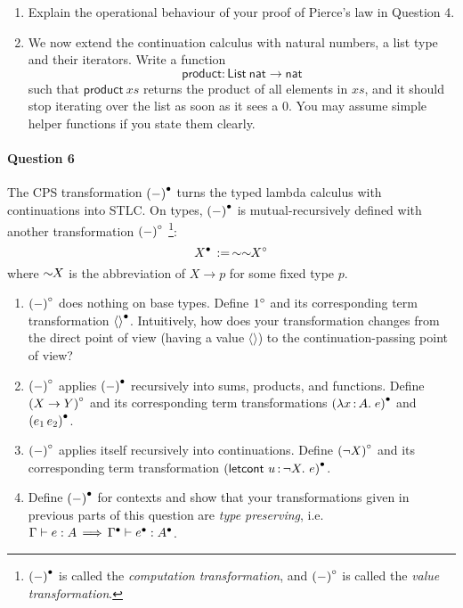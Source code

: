 \documentclass[11pt,a4paper,twoside]{article}
\begin{document}
\begin{enumerate}[label=(\alph*)]
  \item Explain the operational behaviour of your proof of Pierce's law in Question 4.

  \item We now extend the continuation calculus with natural numbers, a list type and their iterators.
  Write a function
    \[\mathsf{product} : \mathsf{List}\ \mathsf{nat} \to \mathsf{nat}\]
  such that $\mathsf{product}\ xs$ returns the product of all elements in $xs$, 
  and it should stop iterating over the list as soon as it sees a $0$.
  You may assume simple helper functions if you state them clearly.
\end{enumerate}

\paragraph{Question 6} The CPS transformation ${(-)}^{\bullet}$
turns the typed lambda calculus with continuations into STLC.
On types, ${(-)}^{\bullet}$ is mutual-recursively defined with another transformation ${(-)}^{\circ}$
\footnote{${(-)}^{\bullet}$ is called the \emph{computation transformation},
and  ${(-)}^{\circ}$ is called the \emph{value transformation}.}:
  \[
    {X}^{\bullet} \,:=\, \sim\sim\!\!{X}^{\circ}
  \]
where $\sim\!\!X$ is the abbreviation of $X \to p$ for some fixed type $p$.
\begin{enumerate}[label=(\alph*)]
  \item ${(-)}^{\circ}$ does nothing on base types. Define ${1}^{\circ}$ 
  and its corresponding term transformation ${\langle\rangle}^{\bullet}$.
  Intuitively, how does your transformation changes from the direct point of view
  (having a value $\langle\rangle$)
  to the continuation-passing point of view?

  \item ${(-)}^{\circ}$ applies ${(-)}^{\bullet}$ recursively into sums, products, and functions. 
  Define ${(X \to Y)}^{\circ}$ 
  and its corresponding term transformations ${(\lambda x \,{:}\, A .\; e)}^{\bullet}$ and ${(e_1 \, e_2)}^{\bullet}$.

  \item ${(-)}^{\circ}$ applies itself recursively into continuations. Define ${(\neg X)}^{\circ}$ 
  and its corresponding term transformation $\Tdot{\mathsf{(letcont}\ \var{u}{\neg X}.\ e)}$.

  \item Define ${(-)}^{\bullet}$ for contexts and show that your transformations given in previous parts of this question
  are \emph{type preserving}, i.e.~$\Gamma \vdash e : A \,\Longrightarrow\, {\Gamma}^{\bullet} \vdash {e}^{\bullet} : {A}^{\bullet}$.
\end{enumerate}
\end{document}
